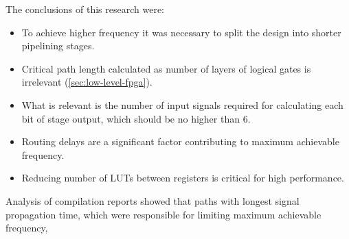The conclusions of this research were:
\begin{itemize}
\item To achieve higher frequency it was necessary to split the design into shorter pipelining stages.
\item Critical path length calculated as number of layers of logical gates is irrelevant (\ref{sec:low-level-fpga}).
\item What is relevant is the number of input signals required for calculating each bit of stage output, which should be no higher than 6.
\item Routing delays are a significant factor contributing to maximum achievable frequency.
\item Reducing number of LUTs between registers is critical for high performance.
\end{itemize}

Analysis of compilation reports showed that paths with longest signal propagation time, which were responsible for limiting maximum achievable frequency, 





